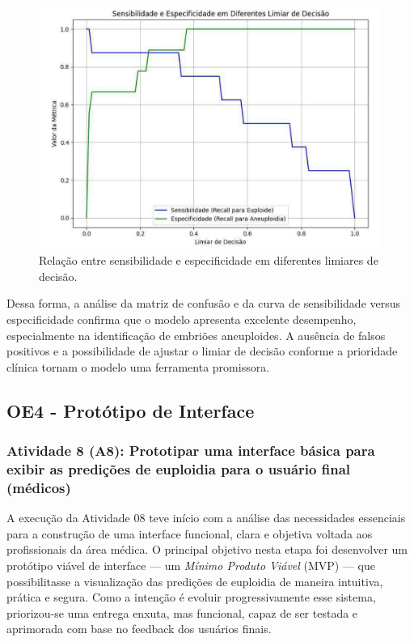 \begin{figure}[h]
    \captionsetup{font=footnotesize, justification=centering, labelsep=period, position=above}
    \caption{Relação entre sensibilidade e especificidade em diferentes limiares de decisão.}
    \label{fig:sensibilidade}
    \centering
    \includegraphics[scale=0.45]{figuras/IA/sensibilidade.pdf}
\end{figure}
\FloatBarrier

Dessa forma, a análise da matriz de confusão e da curva de sensibilidade versus especificidade confirma que o modelo apresenta excelente desempenho, especialmente na identificação de embriões aneuploides. A ausência de falsos positivos e a possibilidade de ajustar o limiar de decisão conforme a prioridade clínica tornam o modelo uma ferramenta promissora.

\subsection{OE4 - Protótipo de Interface}
\subsubsection{Atividade 8 (A8): Prototipar uma interface básica para exibir as predições de euploidia para o usuário final (médicos)}
A execução da Atividade 08 teve início com a análise das necessidades essenciais para a construção de uma interface funcional, clara e objetiva voltada aos profissionais da área médica. O principal objetivo nesta etapa foi desenvolver um protótipo viável de interface — um \textit{Mínimo Produto Viável} (MVP) — que possibilitasse a visualização das predições de euploidia de maneira intuitiva, prática e segura. Como a intenção é evoluir progressivamente esse sistema, priorizou-se uma entrega enxuta, mas funcional, capaz de ser testada e aprimorada com base no feedback dos usuários finais.

